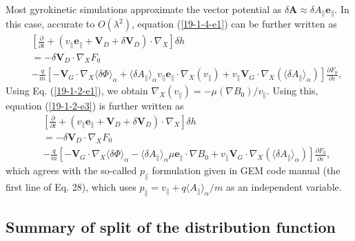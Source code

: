 \documentclass{article}
\begin{document}
Most gyrokinetic simulations approximate the vector potential as $\delta
\mathbf{A} \approx \delta A_{\parallel} \mathbf{e}_{\parallel}$. In this case,
accurate to $O (\lambda^2)$, equation (\ref{19-1-4-e1}) can be further written
as
\begin{eqnarray}
  &  & \left[ \frac{\partial}{\partial t} + (v_{\parallel}
  \mathbf{e}_{\parallel} +\mathbf{V}_D + \delta \mathbf{V}_D) \cdot \nabla_X
  \right] \delta h \nonumber\\
  &  & = - \delta \mathbf{V}_D \cdot \nabla_X F_0 \nonumber\\
  &  & - \frac{q}{m} [-\mathbf{V}_G \cdot \nabla_X \langle \delta \Phi
  \rangle_{\alpha} + \langle \delta A_{\parallel} \rangle_{\alpha}
  v_{\parallel} \mathbf{e}_{\parallel} \cdot \nabla_X (v_{\parallel}) +
  v_{\parallel} \mathbf{V}_G \cdot \nabla_X (\langle \delta A_{\parallel}
  \rangle_{\alpha})] \frac{\partial F_0}{\partial \varepsilon}, 
  \label{19-1-2-e3}
\end{eqnarray}
Using Eq. (\ref{19-1-2-e1}), we obtain $\nabla_X (v_{\parallel}) = - \mu
(\nabla B_0) / v_{\parallel}$. Using this, equation (\ref{19-1-2-e3}) is
further written as
\begin{eqnarray}
  &  & \left[ \frac{\partial}{\partial t} + (v_{\parallel}
  \mathbf{e}_{\parallel} +\mathbf{V}_D + \delta \mathbf{V}_D) \cdot \nabla_X
  \right] \delta h \nonumber\\
  &  & = - \delta \mathbf{V}_D \cdot \nabla_X F_0 \nonumber\\
  &  & - \frac{q}{m} [-\mathbf{V}_G \cdot \nabla_X \langle \delta \Phi
  \rangle_{\alpha} - \langle \delta A_{\parallel} \rangle_{\alpha} \mu
  \mathbf{e}_{\parallel} \cdot \nabla B_0 + v_{\parallel} \mathbf{V}_G \cdot
  \nabla_X (\langle \delta A_{\parallel} \rangle_{\alpha})] \frac{\partial
  F_0}{\partial \varepsilon},  \label{19-1-4-5}
\end{eqnarray}
which agrees with the so-called $p_{\parallel}$ formulation given in GEM code
manual (the first line of Eq. 28), which uses $p_{\parallel} = v_{\parallel} +
q \langle A_{\parallel} \rangle_{\alpha} / m$ as an independent variable.

\subsection{Summary of split of the distribution function}
\end{document}
